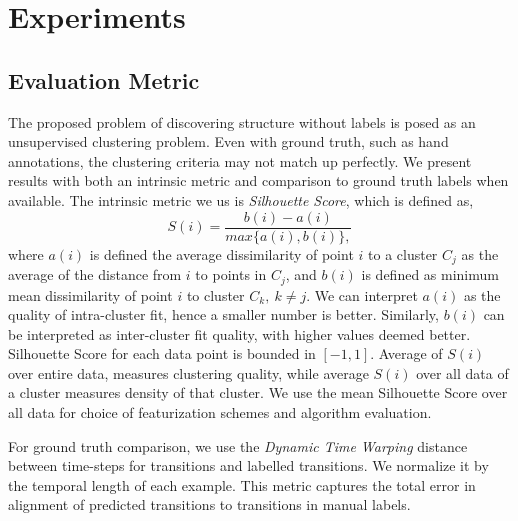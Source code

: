 \section{Experiments}

\subsection{Evaluation Metric}
The proposed problem of discovering structure without labels is posed as an unsupervised clustering problem. 
Even with ground truth, such as hand annotations, the clustering criteria may not match up perfectly.
We present results with both an intrinsic metric and comparison to ground truth labels when available.
The intrinsic metric we us is \textit{Silhouette Score}, which is defined as,  \vspace{-5pt}
\[ S(i) = \frac{b(i) - a(i)}{max\{a(i), b(i)\},}
\]
where $a(i)$ is defined the average dissimilarity of point $i$ to a cluster $C_j$ as the average of the distance from $i$ to points in $C_j$, and $b(i)$ is defined as minimum mean dissimilarity of point $i$ to cluster $C_k,\ k\neq j$. We can interpret $a(i)$ as the quality of intra-cluster fit, hence a smaller number is better. Similarly, $b(i)$ can be interpreted as inter-cluster fit quality, with higher values deemed better. 
Silhouette Score for each data point is bounded in $[-1, 1]$. Average of $S(i)$ over entire data, measures clustering quality, while average $S(i)$ over all data of a cluster measures density of that cluster. 
We use the mean Silhouette Score over all data for choice of featurization schemes and algorithm evaluation.

For ground truth comparison, we use the \textit{Dynamic Time Warping} distance  between time-steps for transitions and labelled transitions. We normalize it by the temporal length of each example. This metric captures the total error in alignment of predicted transitions to transitions in manual labels. 


